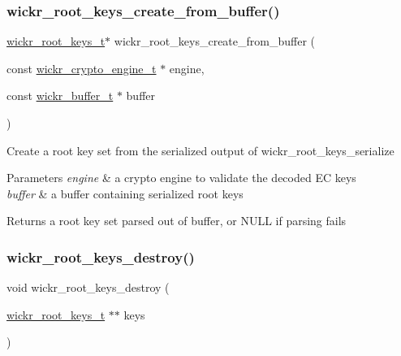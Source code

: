 \subsubsection{\texorpdfstring{wickr\+\_\+root\+\_\+keys\+\_\+create\+\_\+from\+\_\+buffer()}{wickr\_root\_keys\_create\_from\_buffer()}}
{\footnotesize\ttfamily \hyperlink{structwickr__root__keys}{wickr\+\_\+root\+\_\+keys\+\_\+t}$\ast$ wickr\+\_\+root\+\_\+keys\+\_\+create\+\_\+from\+\_\+buffer (\begin{DoxyParamCaption}\item[{const \hyperlink{structwickr__crypto__engine}{wickr\+\_\+crypto\+\_\+engine\+\_\+t} $\ast$}]{engine,  }\item[{const \hyperlink{structwickr__buffer}{wickr\+\_\+buffer\+\_\+t} $\ast$}]{buffer }\end{DoxyParamCaption})}

Create a root key set from the serialized output of \textquotesingle{}wickr\+\_\+root\+\_\+keys\+\_\+serialize\textquotesingle{}


\begin{DoxyParams}{Parameters}
{\em engine} & a crypto engine to validate the decoded EC keys \\
\hline
{\em buffer} & a buffer containing serialized root keys \\
\hline
\end{DoxyParams}
\begin{DoxyReturn}{Returns}
a root key set parsed out of buffer, or N\+U\+LL if parsing fails 
\end{DoxyReturn}
\mbox{\label{group__wickr__root__keys_gacabc33b7c56cbc84a5085d0a4330694f}} 
\subsubsection{\texorpdfstring{wickr\+\_\+root\+\_\+keys\+\_\+destroy()}{wickr\_root\_keys\_destroy()}}
{\footnotesize\ttfamily void wickr\+\_\+root\+\_\+keys\+\_\+destroy (\begin{DoxyParamCaption}\item[{\hyperlink{structwickr__root__keys}{wickr\+\_\+root\+\_\+keys\+\_\+t} $\ast$$\ast$}]{keys }\end{DoxyParamCaption})}

